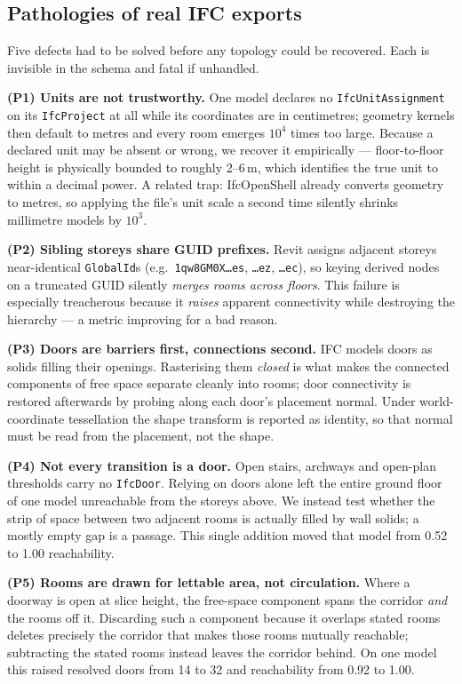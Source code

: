 \documentclass[10pt,twocolumn,letterpaper]{article}
\begin{document}
\subsection{Pathologies of real IFC exports}

Five defects had to be solved before any topology could be recovered. Each is
invisible in the schema and fatal if unhandled.

\medskip\noindent\textbf{(P1) Units are not trustworthy.} One model declares no
\texttt{IfcUnitAssignment} on its \texttt{IfcProject} at all while its
coordinates are in centimetres; geometry kernels then default to metres and
every room emerges $10^4$ times too large. Because a declared unit may be absent
or wrong, we recover it empirically --- floor-to-floor height is physically
bounded to roughly 2--6\,m, which identifies the true unit to within a decimal
power. A related trap: IfcOpenShell already converts geometry to metres, so
applying the file's unit scale a second time silently shrinks millimetre models
by $10^3$.

\medskip\noindent\textbf{(P2) Sibling storeys share GUID prefixes.} Revit
assigns adjacent storeys near-identical \texttt{GlobalId}s (e.g.\
\texttt{1qw8GM0X\ldots es}, \texttt{\ldots ez}, \texttt{\ldots ec}), so keying
derived nodes on a truncated GUID silently \emph{merges rooms across floors}.
This failure is especially treacherous because it \emph{raises} apparent
connectivity while destroying the hierarchy --- a metric improving for a bad
reason.

\medskip\noindent\textbf{(P3) Doors are barriers first, connections second.}
IFC models doors as solids filling their openings. Rasterising them \emph{closed}
is what makes the connected components of free space separate cleanly into
rooms; door connectivity is restored afterwards by probing along each door's
placement normal. Under world-coordinate tessellation the shape transform is
reported as identity, so that normal must be read from the placement, not the
shape.

\medskip\noindent\textbf{(P4) Not every transition is a door.} Open stairs,
archways and open-plan thresholds carry no \texttt{IfcDoor}. Relying on doors
alone left the entire ground floor of one model unreachable from the storeys
above. We instead test whether the strip of space between two adjacent rooms is
actually filled by wall solids; a mostly empty gap is a passage. This single
addition moved that model from 0.52 to 1.00 reachability.

\medskip\noindent\textbf{(P5) Rooms are drawn for lettable area, not
circulation.} Where a doorway is open at slice height, the free-space component
spans the corridor \emph{and} the rooms off it. Discarding such a component
because it overlaps stated rooms deletes precisely the corridor that makes those
rooms mutually reachable; subtracting the stated rooms instead leaves the
corridor behind. On one model this raised resolved doors from 14 to 32 and
reachability from 0.92 to 1.00.
\end{document}
